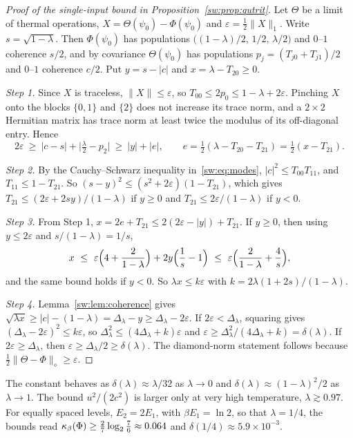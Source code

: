 \begin{proof}[Proof of the single-input bound in Proposition~\ref{sw:prop:qutrit}]
Let $\Theta$ be a limit of thermal operations, $X=\Theta(\psi_0)-\Phi(\psi_0)$ and $\varepsilon=\frac12\|X\|_1$. Write $s=\sqrt{1-\lambda}$. Then $\Phi(\psi_0)$ has populations $\bigl((1-\lambda)/2,\,1/2,\,\lambda/2\bigr)$ and $0$--$1$ coherence $s/2$, and by covariance $\Theta(\psi_0)$ has populations $p_j=(T_{j0}+T_{j1})/2$ and $0$--$1$ coherence $c/2$. Put $y=s-|c|$ and $x=\lambda-T_{20}\ge0$.

\emph{Step 1.} Since $X$ is traceless, $\|X\|\le\varepsilon$, so $T_{00}\le2p_0\le1-\lambda+2\varepsilon$. Pinching $X$ onto the blocks $\{0,1\}$ and $\{2\}$ does not increase its trace norm, and a $2\times2$ Hermitian matrix has trace norm at least twice the modulus of its off-diagonal entry. Hence
\[
2\varepsilon\ \ge\ |c-s|+\bigl|\tfrac\lambda2-p_2\bigr|\ \ge\ |y|+|e|,\qquad e=\tfrac12(\lambda-T_{20}-T_{21})=\tfrac12(x-T_{21}).
\]

\emph{Step 2.} By the Cauchy--Schwarz inequality in~\eqref{sw:eq:modes}, $|c|^2\le T_{00}T_{11}$, and $T_{11}\le1-T_{21}$. So $(s-y)^2\le(s^2+2\varepsilon)(1-T_{21})$, which gives $T_{21}\le(2\varepsilon+2sy)/(1-\lambda)$ if $y\ge0$ and $T_{21}\le2\varepsilon/(1-\lambda)$ if $y<0$.

\emph{Step 3.} From Step 1, $x=2e+T_{21}\le2(2\varepsilon-|y|)+T_{21}$. If $y\ge0$, then using $y\le2\varepsilon$ and $s/(1-\lambda)=1/s$,
\[
x\ \le\ \varepsilon\Bigl(4+\frac2{1-\lambda}\Bigr)+2y\Bigl(\frac1s-1\Bigr)\ \le\ \varepsilon\Bigl(\frac2{1-\lambda}+\frac4s\Bigr),
\]
and the same bound holds if $y<0$. So $\lambda x\le k\varepsilon$ with $k=2\lambda(1+2s)/(1-\lambda)$.

\emph{Step 4.} Lemma~\ref{sw:lem:coherence} gives $\sqrt{\lambda x}\ge|c|-(1-\lambda)=\Delta_\lambda-y\ge\Delta_\lambda-2\varepsilon$. If $2\varepsilon<\Delta_\lambda$, squaring gives $(\Delta_\lambda-2\varepsilon)^2\le k\varepsilon$, so $\Delta_\lambda^2\le(4\Delta_\lambda+k)\varepsilon$ and $\varepsilon\ge\Delta_\lambda^2/(4\Delta_\lambda+k)=\delta(\lambda)$. If $2\varepsilon\ge\Delta_\lambda$, then $\varepsilon\ge\Delta_\lambda/2\ge\delta(\lambda)$. The diamond-norm statement follows because $\frac12\|\Theta-\Phi\|_\diamond\ge\varepsilon$.
\end{proof}

The constant behaves as $\delta(\lambda)\approx\lambda/32$ as $\lambda\to0$ and $\delta(\lambda)\approx(1-\lambda)^2/2$ as $\lambda\to1$. The bound $u^2/(2c^2)$ is larger only at very high temperature, $\lambda\gtrsim0.97$. For equally spaced levels, $E_2=2E_1$, with $\beta E_1=\ln2$, so that $\lambda=1/4$, the bounds read $\kappa_\beta(\Phi)\ge\frac27\log_2\frac76\approx0.064$ and $\delta(1/4)\approx5.9\times10^{-3}$.

